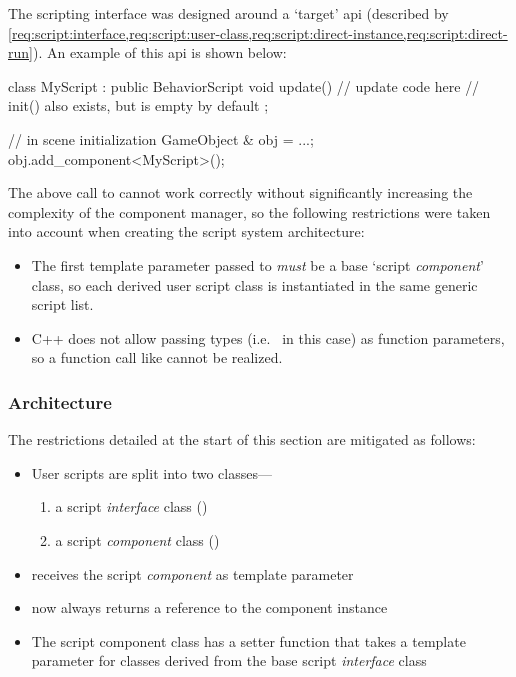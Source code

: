 \documentclass{projdoc}
\begin{document}
The scripting interface was designed around a `target' \gls{api} (described by
\cref{req:script:interface,req:script:user-class,req:script:direct-instance,req:script:direct-run}).
An example of this \gls{api} is shown below:\noparbreak

\begin{blockcode}
class MyScript : public BehaviorScript {
	void update() {
		// update code here
	}
	// init() also exists, but is empty by default
};

{ // in scene initialization
	GameObject & obj = ...;
	obj.add_component<MyScript>();
}
\end{blockcode}

The above call to  cannot work correctly
without significantly increasing the complexity of the component manager, so the
following restrictions were taken into account when creating the script system
architecture:\noparbreak

\begin{itemize}
	\item The first template parameter passed to 
		\emph{must} be a base `script \emph{component}' class, so each derived user
		script class is instantiated in the same generic script list.
	\item C++ does not allow passing types (i.e.~ in this case) as
		function parameters, so a function call like
		 cannot be realized.
\end{itemize}

\subsubsection{Architecture}

The restrictions detailed at the start of this section are mitigated as
follows:\noparbreak

\begin{itemize}
	\item User scripts are split into two classes---
		\begin{enumerate}
			\item a script \emph{interface} class ()
			\item a script \emph{component} class ()
		\end{enumerate}
	\item {} receives the script \emph{component}
		as template parameter
	\item {} now always returns a reference to the
		component instance
	\item The script component class has a setter function that takes a template
		parameter for classes derived from the base script \emph{interface} class
\end{itemize}
\end{document}
